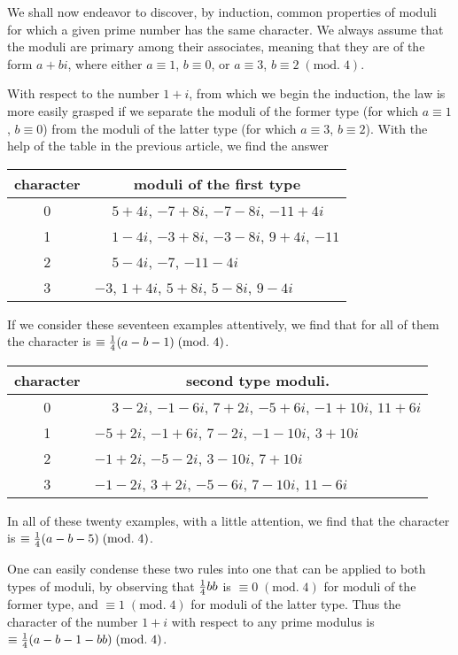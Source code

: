 \documentclass[twoside,12pt]{memoir}
\renewcommand{\pmod}[1]{\;(\textrm{mod.}\;#1)}
\let\oldfrac\frac
\def\frac#1#2{\mathchoice{\tfrac{#1}{#2}}{\oldfrac{#1}{#2}}{\genfrac{}{}{}{2}{#1}{#2\mathstrut}}{\genfrac{}{}{}{3}{#1}{#2\mathstrut}}}
\begin{document}
We shall now endeavor to discover, by induction, common properties of moduli for which a given prime number has the same character.  We always assume that the moduli are primary among their associates, meaning that they are of the form \(a+b i\), where either \(a \equiv 1\), \(b \equiv 0\), or \(a \equiv 3\), \(b \equiv 2\pmod{4}\).

With respect to the number \(1+i\), from which we begin the induction, the law is more easily grasped if we separate the moduli of the former type (for which \(a \equiv 1\), \(b \equiv 0\)) from the moduli of the latter type (for which \(a \equiv 3\), \(b \equiv 2\)). With the help of the table in the previous article, we find the answer
\begin{center}
\begin{tabular}{c|l}
character & \multicolumn{1}{c}{moduli of the first type} \\
\hline
0 & \(\phantom{+}5+4 i\), \(-7+8 i\), \(-7-8 i\), \(-11+4 i\) \\
1 & \(\phantom{+}1-4 i\), \(-3+8 i\), \(-3-8 i\), \(9+4i\), \(-11\) \\
2 & \(\phantom{+}5-4 i\), \(-7\), \(-11-4 i\) \\
3 & \(-3\), \(1+4 i\), \(5+8 i\), \(5-8 i\), \(9-4 i\) \\
\end{tabular}
\end{center}
If we consider these seventeen examples attentively, we find that for all of them the character is \(\equiv \frac{1}{4}(a-b-1)\pmod{4}\).
%

\begin{center}
\begin{tabular}{c|l}
character & \multicolumn{1}{c}{second type moduli.} \\
\hline
0 & \(\phantom{+}3-2 i\), \(-1-6 i\), \(7+2 i\), \(-5+6 i\), \(-1+10 i\), \(11+6 i\) \\
1 & \(-5+2 i\), \(-1+6 i\), \(7-2 i\), \(-1-10 i\), \(3+10 i\) \\
2 & \(-1+2 i\), \(-5-2 i\), \(3-10 i\), \(7+10 i\) \\
3 & \(-1-2 i\), \(3+2 i\), \(-5-6 i\), \(7-10 i\), \(11-6 i\) \\
\end{tabular}
\end{center}

In all of these twenty examples, with a little attention, we find that the character is \(\equiv \frac{1}{4}(a-b-5)\pmod{4}\).
%

One can easily condense these two rules into one that can be applied to both types of moduli, by observing that \(\frac{1}{4} b b\) is \(\equiv 0\pmod{4}\) for moduli of the former type, and \(\equiv 1\pmod{4}\) for moduli of the latter type. Thus the character of the number \(1+i\) with respect to any prime modulus is \(\equiv \frac{1}{4}(a-b-1-b b)\pmod{4}\).
\end{document}

